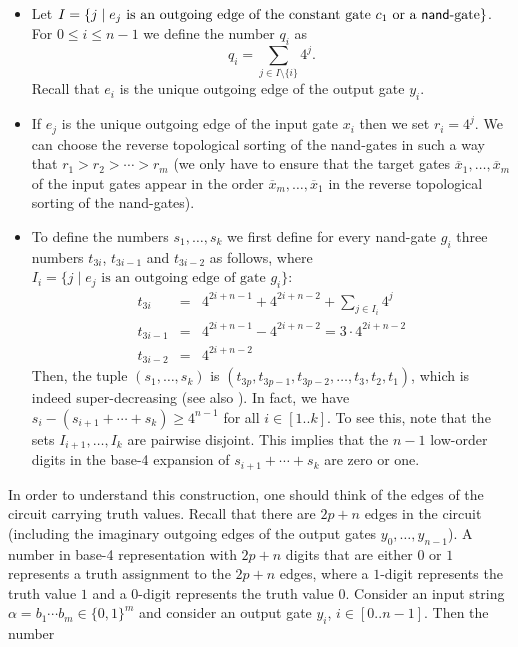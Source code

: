 \documentclass[10pt,a4paper]{article}
\newcommand{\ccinterval}[2]{[{#1}..{#2}]}
\newcommand{\cointerval}[2]{[{#1}..{#2}-1]}
\begin{document}
\begin{itemize}
\item
Let $I = \{ j \mid e_j \text{ is an outgoing edge of the constant gate  $c_1$ or a {\sf nand}-gate} \}$.
For $0 \leq i \leq n-1$ we define the number $q_{i}$ as 
$$
q_{i} = \sum_{j \in I \setminus \{i\}} 4^j .
$$
Recall that $e_i$ is the unique outgoing edge of the output gate $y_i$.
\item If $e_j$ is the unique outgoing edge of the input gate $x_i$ then we set $r_i = 4^j$. We can choose the reverse
topological sorting of the {\sf nand}-gates in such a way that $r_1 > r_2 > \cdots > r_m$ (we only have to ensure that the target
gates $\overline{x}_1, \ldots, \overline{x}_m$ of the input gates appear in the order $\overline{x}_m, \ldots, \overline{x}_1$ in the 
reverse topological sorting of the {\sf nand}-gates).
\item To define the numbers $s_1, \ldots, s_k$ we first define for every {\sf nand}-gate $g_i$
three numbers $t_{3i}$, $t_{3i-1}$ and $t_{3i-2}$ as follows, where 
$I_i = \{ j \mid e_j \text{ is an outgoing edge of gate } g_i \}$:
\begin{eqnarray*}
t_{3i}       &=& 4^{2i+n-1} + 4^{2i+n-2} + \sum_{j \in I_i} 4^j \\
t_{3i-1} &=& 4^{2i+n-1} - 4^{2i+n-2} = 3 \cdot 4^{2i+n-2} \\
t_{3i-2}    &=& 4^{2i+n-2}   
\end{eqnarray*}
Then, the tuple $(s_1,\ldots, s_k)$ is $(t_{3p}, t_{3p-1}, t_{3p-2}, \ldots, t_3, t_2, t_1)$, which is indeed
super-decreasing (see also \cite{ref30}). In fact, we have $s_i - (s_{i+1} + \cdots + s_k) \geq 4^{n-1}$ for all $i \in \ccinterval{1}{k}$.
To see this, note that the sets $I_{i+1},\ldots, I_k$ are pairwise disjoint.  This implies that the $n-1$ low-order digits in the base-4 expansion of 
$s_{i+1} + \cdots + s_k$ are zero or one.

\end{itemize}
In order to understand this construction, one should think of the edges of the circuit carrying truth values.
Recall that there are $2p+n$ edges in the circuit (including the imaginary outgoing edges of the output gates
$y_0, \ldots, y_{n-1}$). 
A number in base-4 representation with $2p+n$ digits that are either $0$ or $1$ represents a truth assignment to the $2p+n$ edges,
where a $1$-digit represents the truth value $1$ and a $0$-digit represents the truth value $0$.
Consider  an input string $\alpha = b_1 \cdots b_m \in \{0,1\}^m$  and 
consider an output gate $y_i$, $i \in \cointerval{0}{n}$. Then the number
\end{document}
